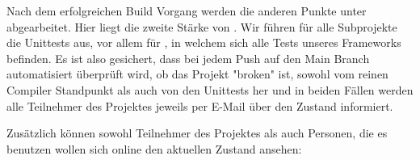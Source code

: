 Nach dem erfolgreichen Build Vorgang werden die anderen Punkte unter  abgearbeitet. Hier liegt die zweite Stärke von . Wir führen für alle Subprojekte die Unittests aus, vor allem für , in welchem sich alle Tests unseres Frameworks befinden.
Es ist also gesichert, dass bei jedem Push auf den Main Branch automatisiert überprüft wird, ob das Projekt "broken" ist, sowohl vom reinen Compiler Standpunkt als auch von den Unittests her und in beiden Fällen werden alle Teilnehmer des Projektes jeweils per E-Mail über den Zustand informiert.

Zusätzlich können sowohl Teilnehmer des Projektes als auch Personen, die es benutzen wollen sich online den aktuellen Zustand ansehen:

